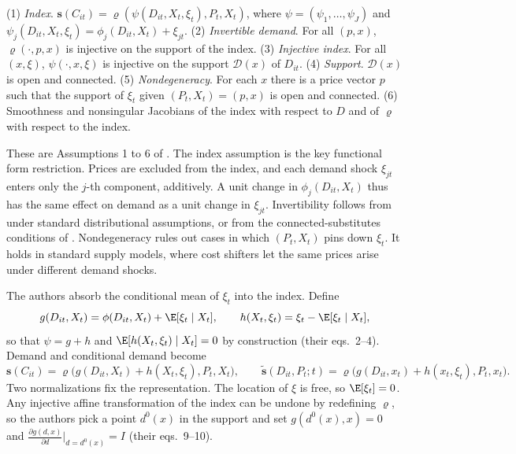 \begin{assumption}\label{ass:08-bh}
(1) \emph{Index}. $\mathbf{s}(C_{it}) = \varrho(\psi(D_{it}, X_t, \xi_t), P_t, X_t)$, where
$\psi = (\psi_1, \dots, \psi_J)$ and $\psi_j(D_{it}, X_t, \xi_t) = \phi_j(D_{it}, X_t) + \xi_{jt}$. (2)
\emph{Invertible demand}. For all $(p, x)$, $\varrho(\cdot, p, x)$ is injective on the support of the index. (3)
\emph{Injective index}. For all $(x, \xi)$, $\psi(\cdot, x, \xi)$ is injective on the support $\mathcal{D}(x)$ of
$D_{it}$. (4) \emph{Support}. $\mathcal{D}(x)$ is open and connected. (5) \emph{Nondegeneracy}. For each $x$ there is a
price vector $p$ such that the support of $\xi_t$ given $(P_t, X_t) = (p, x)$ is open and connected. (6) Smoothness and
nonsingular Jacobians of the index with respect to $D$ and of $\varrho$ with respect to the index.
\end{assumption}

These are Assumptions 1 to 6 of \citet[pp.~1141--1143]{BerryHaile2024}. The index assumption is the key functional form
restriction. Prices are excluded from the index, and each demand shock $\xi_{jt}$ enters only the $j$-th component,
additively. A unit change in $\phi_j(D_{it}, X_t)$ thus has the same effect on demand as a unit change in $\xi_{jt}$.
Invertibility follows from \citet{Berry1994} under standard distributional assumptions, or from the connected-substitutes
conditions of \citet{BerryGandhiHaile2013}. Nondegeneracy rules out cases in which $(P_t, X_t)$ pins down $\xi_t$. It
holds in standard supply models, where cost shifters let the same prices arise under different demand shocks.

The authors absorb the conditional mean of $\xi_t$ into the index. Define
\begin{equation}\label{eq:08-bh-gh}
  g(D_{it}, X_t) = \phi(D_{it}, X_t) + \E[\xi_t \mid X_t], \qquad h(X_t, \xi_t) = \xi_t - \E[\xi_t \mid X_t],
\end{equation}
so that $\psi = g + h$ and $\E[h(X_t, \xi_t) \mid X_t] = 0$ by construction (their eqs.~2--4). Demand and conditional
demand become
\begin{equation}\label{eq:08-bh-rep}
  \mathbf{s}(C_{it}) = \varrho\big(g(D_{it}, X_t) + h(X_t, \xi_t), P_t, X_t\big), \qquad
  \tilde{\mathbf{s}}(D_{it}, P_t; t) = \varrho\big(g(D_{it}, x_t) + h(x_t, \xi_t), P_t, x_t\big).
\end{equation}
Two normalizations fix the representation. The location of $\xi$ is free, so $\E[\xi_t] = 0$. Any injective affine
transformation of the index can be undone by redefining $\varrho$, so the authors pick a point $d^0(x)$ in the support
and set $g(d^0(x), x) = 0$ and $\frac{\partial g(d, x)}{\partial d}\big|_{d = d^0(x)} = I$ (their eqs.~9--10).

